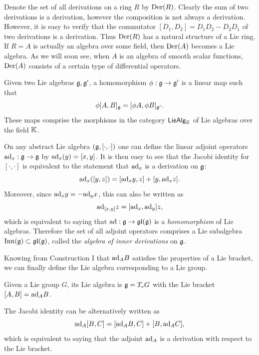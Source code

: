 \begin{example}
    Denote the set of all derivations on a ring $R$ by $\operatorname{Der}(R)$. Clearly the sum of two derivations is a derivation, however the composition is not always a derivation. However, it is easy to verify that the commutator $[D_1,D_2]=D_1D_2-D_2D_1$ of two derivations is a derivation. Thus $\operatorname{Der}(R)$ has a natural structure of a Lie ring. If $R=A$ is actually an algebra over some field, then $\operatorname{Der}(A)$ becomes a Lie algebra. As we will soon see, when $A$ is an algebra of smooth scalar functions, $\operatorname{Der}(A)$ consists of a certain type of differential operators.
\end{example}



\begin{defn}
    Given two Lie algebras $\mathfrak{g},\mathfrak{g}'$, a homomorphism $\phi:\mathfrak{g}\to\mathfrak{g}'$ is a linear map such that 
    \[\phi[A,B]_{\mathfrak{g}}=[\phi A,\phi B]_{\mathfrak{g}'}.\]
    These maps comprise the morphisms in the category $\mathsf{LieAlg}_{\mathbb{K}}$ of Lie algebras over the field $\mathbb{K}$.
\end{defn}


\begin{example}
    On any abstract Lie algebra $(\mathfrak{g},[\cdot,\cdot])$ one can define the linear adjoint operators $\mathrm{ad}_x:\mathfrak{g}\to\mathfrak{g}$ by $\mathrm{ad}_x(y)=[x,y]$. It is then easy to see that the Jacobi identity for $[\cdot,\cdot]$ is equivalent to the statement that $\mathrm{ad}_x$ is a derivation on $\mathfrak{g}$:
    \[\mathrm{ad}_x([y,z])=[\mathrm{ad}_x y,z]+[y,\mathrm{ad}_x z].\]
    Moreover, since $\mathrm{ad}_x y=-\mathrm{ad}_y x$, this can also be written as
    \[\mathrm{ad}_{[x,y]}z=[\mathrm{ad}_x,\mathrm{ad}_y]z,\]
    which is equivalent to saying that $\mathrm{ad}:\mathfrak{g}\to \mathfrak{gl}(\mathfrak{g})$ is a \emph{homomorphism} of Lie algebras. Therefore the set of all adjoint operators comprises a Lie subalgebra $\operatorname{Inn}(\mathfrak{g})\subset \mathfrak{gl}(\mathfrak{g})$, called the \emph{algebra of inner derivations} on $\mathfrak{g}$.
\end{example}



Knowing from Construction I that $\mathrm{ad}_A B$ satisfies the properties of a Lie bracket, we can finally define the Lie algebra corresponding to a Lie group.

\begin{defn}
    Given a Lie group $G$, its Lie algebra is $\mathfrak{g}=T_e  G$ with the Lie bracket $[A,B]=\mathrm{ad}_A B$. 
    
    The Jacobi identity can be alternatively written as
    \[\mathrm{ad}_A[B,C]=[\mathrm{ad}_A B,C]+[B,\mathrm{ad}_A C],\]
    which is equivalent to saying that the adjoint $\mathrm{ad}_A$ is a derivation with respect to the Lie bracket. 
\end{defn}

